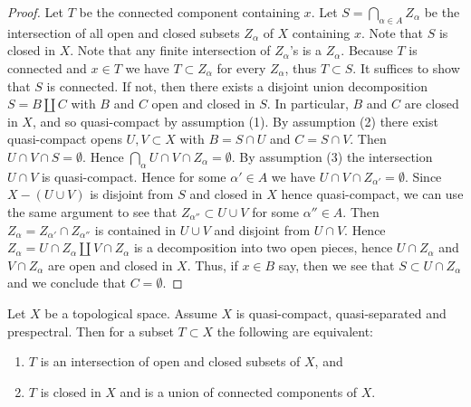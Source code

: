 \begin{proof}
  Let $T$ be the connected component containing $x$. Let $S = \bigcap_{\alpha \in A} Z_\alpha$ be the intersection of all open and closed subsets $Z_\alpha$ of $X$ containing $x$. Note that $S$ is closed in $X$. Note that any finite intersection of $Z_\alpha$'s is a $Z_\alpha$. Because $T$ is connected and $x \in T$ we have $T \subset Z_\alpha$ for every \(Z_\alpha\), thus \(T \subset S\). It suffices to show that $S$ is connected. If not, then there exists a disjoint union decomposition $S = B \amalg C$ with $B$ and $C$ open and closed in $S$. In particular, $B$ and $C$ are closed in $X$, and so quasi-compact by assumption (1). By assumption (2) there exist quasi-compact opens $U, V \subset X$ with $B = S \cap U$ and $C = S \cap V$. Then $U \cap V \cap S = \emptyset$. Hence $\bigcap_\alpha U \cap V \cap Z_\alpha = \emptyset$. By assumption (3) the intersection $U \cap V$ is quasi-compact. Hence for some $\alpha' \in A$ we have $U \cap V \cap Z_{\alpha'} = \emptyset$. Since $X - (U \cup V)$ is disjoint from $S$ and closed in $X$ hence quasi-compact, we can use the same argument to see that $Z_{\alpha''} \subset U \cup V$ for some $\alpha'' \in A$. Then $Z_\alpha = Z_{\alpha'} \cap Z_{\alpha''}$ is contained in $U \cup V$ and disjoint from $U \cap V$. Hence $Z_\alpha = U \cap Z_\alpha \amalg V \cap Z_\alpha$ is a decomposition into two open pieces, hence $U \cap Z_\alpha$ and $V \cap Z_\alpha$ are open and closed in $X$. Thus, if $x \in B$ say, then we see that $S \subset U \cap Z_\alpha$ and we conclude that $C = \emptyset$.
\end{proof}

\begin{lemma}
  \label{thm:intersection-closed-open-iff}
  \leanok
  Let $X$ be a topological space. Assume $X$ is quasi-compact, quasi-separated
  and prespectral. Then for a subset $T \subset X$ the following are equivalent:
  \begin{enumerate}
    \item $T$ is an intersection of open and closed subsets of $X$, and
    \item $T$ is closed in $X$ and is a union of connected components of $X$.
  \end{enumerate}
\end{lemma}

